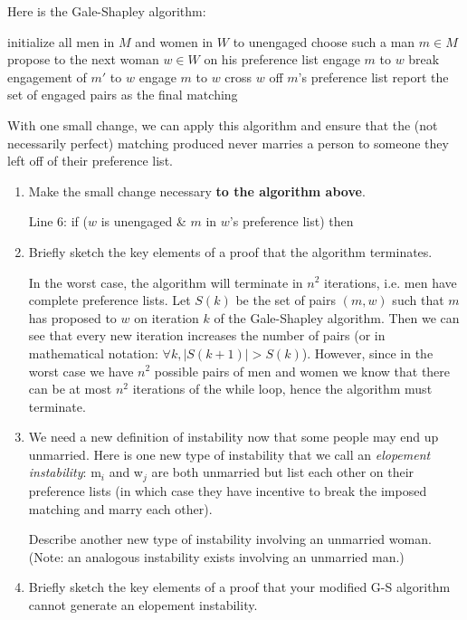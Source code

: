 \documentclass[11pt, oneside]{article}   	%
\theoremstyle{definition}
\theoremstyle{remark}
\begin{document}
Here is the Gale-Shapley algorithm:
  \begin{algorithmic}[1]
    \State initialize all men in $M$ and women in $W$ to unengaged
      \State choose such a man $m \in M$
      \State propose to the next woman $w \in W$ on his preference list
        \State engage $m$ to $w$
        \State break engagement of $m'$ to $w$
        \State engage $m$ to $w$
      \EndIf
      \State cross $w$ off $m$'s preference list
    \EndWhile
    \State report the set of engaged pairs as the final matching
  \EndProcedure
  \end{algorithmic}
With one small change, we can apply this algorithm and ensure that the
(not necessarily perfect) matching produced never marries a person to
someone they left off of their preference list.
\begin{enumerate}
	\item Make the small change necessary \textbf{to the algorithm above}.

	\qquad Line 6: if ($w$ is unengaged \& $m$ in $w$'s preference list) then

	\item Briefly sketch the key elements of a proof that the algorithm terminates.
	
	In the worst case, the algorithm will terminate in $n^2$ iterations, i.e. men have complete preference lists. Let $S(k)$ be the set of pairs $(m, w)$ such that $m$ has proposed to $w$ on iteration $k$ of the Gale-Shapley algorithm. Then we can see that every new iteration increases the number of pairs (or in mathematical notation: $\forall k, |S(k+1)| > S(k)$). However, since in the worst case we have $n^2$ possible pairs of men and women we know that there can be at most $n^2$ iterations of the while loop, hence the algorithm must terminate.
	
	
	\item We need a new definition of instability now that some people may
   end up unmarried. Here is one new type of instability that we call
   an \emph{elopement instability}: m$_i$ and w$_j$ are both unmarried but list
   each other on their preference lists (in which case they have
   incentive to break the imposed matching and marry each other).
   
   Describe another new type of instability involving an unmarried
   woman. (Note: an analogous instability exists involving an
   unmarried man.)
	\item Briefly sketch the key elements of a proof that your modified G-S
   algorithm cannot generate an elopement instability.
\end{enumerate}
\end{document}
